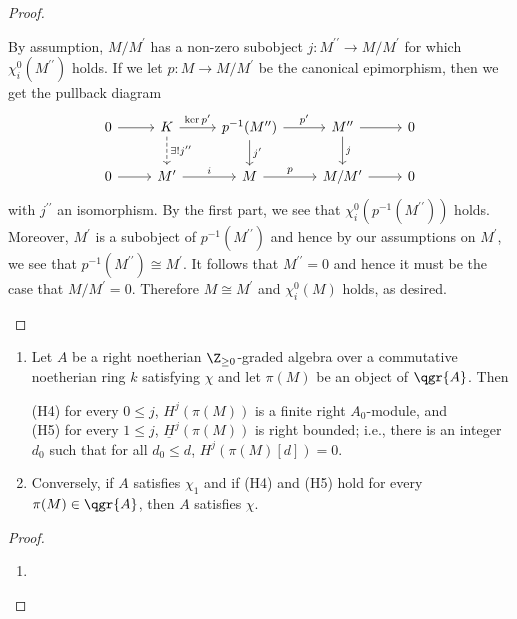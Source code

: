 \documentclass[10pt]{amsart}
\begin{document}
\begin{prop}
\begin{prop}
\begin{proof}
\begin{enumerate}[(i)]
        By assumption, $M/M^\prime$ has a non-zero subobject $j \colon M^{\prime\prime} \rightarrow M/M^\prime$ for which $\chi^0_i(M^{\prime\prime})$ holds.
        If we let $p \colon M \rightarrow M/M^\prime$ be the canonical epimorphism, then we get the pullback diagram
        $$\begin{tikzcd}
          0 \arrow{r} & K \arrow{r}{\ker{p^\prime}}\arrow[dashed]{d}{\exists !j^{\prime\prime}} & p^{-1}(M^{\prime\prime}) \arrow{d}{j^\prime}\arrow{r}{p^\prime} & M^{\prime\prime}\arrow{d}{j} \arrow{r} & 0\\
          0 \arrow{r} & M^\prime \arrow{r}{i} & M \arrow{r}{p} & M/M^\prime \arrow{r} & 0
        \end{tikzcd}$$
        with $j^{\prime\prime}$ an isomorphism.
        By the first part, we see that $\chi^0_i(p^{-1}(M^{\prime\prime}))$ holds.
        Moreover, $M^\prime$ is a subobject of $p^{-1}(M^{\prime\prime})$ and hence by our assumptions on $M^\prime$, we see that $p^{-1}(M^{\prime\prime}) \cong M^\prime$.
        It follows that $M^{\prime\prime} = 0$ and hence it must be the case that $M/M^\prime = 0$.
        Therefore $M \cong M^\prime$ and $\chi^0_i(M)$ holds, as desired.
      \end{enumerate}
    \end{proof}
  \end{prop}
  
  \begin{thm}
    \begin{enumerate}
    \item
      Let $A$ be a right noetherian $\Z_{\geq 0}$-graded algebra over a commutative noetherian ring $k$ satisfying $\chi$ and let $\pi(M)$ be an object of $\qgr{A}$.
      Then
      \begin{center}
        \begin{flushleft}
          (H4) for every $0 \leq j$, $H^j(\pi(M))$ is a finite right $A_0$-module, and\\
          (H5) for every $1 \leq j$, $\underline{H}^j(\pi(M))$ is right bounded; i.e., there is an integer $d_0$ such that for all $d_0 \leq d$, $H^{j}(\pi(M)[d]) = 0$.
        \end{flushleft}
      \end{center}
    \item
      Conversely, if $A$ satisfies $\chi_1$ and if (H4) and (H5) hold for every $\pi(M) \in \qgr{A}$, then $A$ satisfies $\chi$.
    \end{enumerate}

    \begin{proof}
      \begin{enumerate}
      \item
      \end{enumerate}
    \end{proof}
  \end{thm}
\end{prop}
\end{document}
